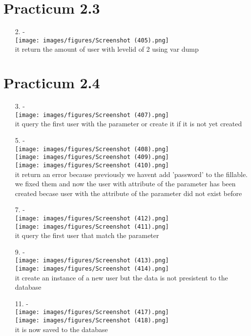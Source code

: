 \documentclass[12pt,titlepage]{article}
\begin{document}
\section{Practicum 2.3}
\begin{enumerate}
    \item[2.] - \\ \texttt{[image: images/figures/Screenshot (405).png]} \\ it return the amount of user with level\textunderscore id of 2 using var dump
\end{enumerate}

\section{Practicum 2.4}
\begin{enumerate}
    \item[3.] - \\ \texttt{[image: images/figures/Screenshot (407).png]} \\ it query the first user with the parameter or create it if it is not yet created
    \item[5.] - \\ \texttt{[image: images/figures/Screenshot (408).png]} \\ \texttt{[image: images/figures/Screenshot (409).png]} \\ \texttt{[image: images/figures/Screenshot (410).png]} \\ it return an error because previously we havent add 'password' to the fillable. we fixed them and now the user with attribute of the parameter has been created becase user with the attribute of the parameter did not exist before
    \item[7.] - \\ \texttt{[image: images/figures/Screenshot (412).png]} \\ \texttt{[image: images/figures/Screenshot (411).png]} \\ it query the first user that match the parameter
    \item[9.] - \\ \texttt{[image: images/figures/Screenshot (413).png]} \\ \texttt{[image: images/figures/Screenshot (414).png]} \\ it create an instance of a new user but the data is not presistent to the database
    \item[11.] - \\ \texttt{[image: images/figures/Screenshot (417).png]} \\ \texttt{[image: images/figures/Screenshot (418).png]} \\ it is now saved to the database
\end{enumerate}
\end{document}
